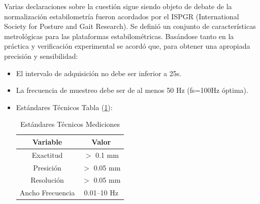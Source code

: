 \documentclass[12pt,a4paper]{article}
\begin{document}
Varias declaraciones sobre la cuestión sigue siendo objeto de debate de la normalización estabilometría fueron acordados por el ISPGR (International Society for Posture and Gait Research).
Se definió un conjunto de características metrológicas para las plataformas estabilométricas.
Basándose tanto en la práctica y verificación experimental se acordó que, para obtener una apropiada precisión y sensibilidad:
\begin{itemize}
	\item El intervalo de adquisición no debe ser inferior a 25s.
	\item La frecuencia de muestreo debe ser de al menos 50 Hz (fs=100Hz óptima).
	\item Estándares Técnicos Tabla (\ref{table:mediciones}):
	\begin{table}[H]
		\centering
		
		\begin{tabular}{|c|c|}			
			\hline \textbf{Variable} & \textbf{Valor} 	\\ 
			\hline Exactitud 	& $>$ 0.1 mm 		\\ 
			\hline Presición 	& $>$ 0.05 mm 		\\ 
			\hline Resolución 	& $>$ 0.05 mm 		\\ 
			\hline Ancho Frecuencia & 0.01–10 Hz	\\ 
			\hline 			
		\end{tabular}
		\caption{Estándares Técnicos Mediciones}
		\label{table:mediciones}
	\end{table}	  
\end{itemize}



\newpage
\end{document}
